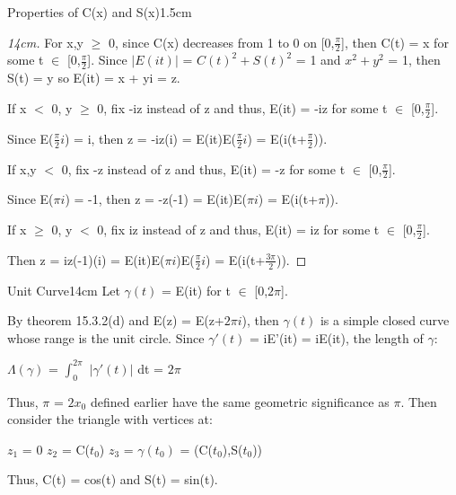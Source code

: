 \begin{ltheorem}{Properties of C(x) and S(x)}{1.5cm}
\begin{proof}[14cm]
                For x,y $\geq$ 0, since C(x) decreases from 1 to 0
                on [0,$\frac{\pi}{2}$], then C(t) = x for some
                t $\in$ [0,$\frac{\pi}{2}$].
                Since $|E(it)|$ = $C(t)^2 + S(t)^2$ = 1
                and $x^2 + y^2$ = 1, then S(t) = y so E(it) = x + yi = z.

                \vspace{0.2cm}

                If x $<$ 0, y $\geq$ 0, fix -iz instead of z and thus,
                E(it) = -iz for some t $\in$ [0,$\frac{\pi}{2}$].
                
                Since E($\frac{\pi}{2}i$) = i, then
                z = -iz(i) = E(it)E($\frac{\pi}{2}i$) = E(i(t+$\frac{\pi}{2}$)).

                \vspace{0.2cm}

                If x,y $<$ 0, fix -z instead of z and thus, E(it) = -z
                for some t $\in$ [0,$\frac{\pi}{2}$].

                Since E($\pi i$) = -1, then
                z = -z(-1) = E(it)E($\pi i$) = E(i(t+$\pi$)).

                \vspace{0.2cm}

                If x $\geq$ 0, y $<$ 0, fix iz instead of z and thus,
                E(it) = iz for some t $\in$ [0,$\frac{\pi}{2}$].

                Then z = iz(-1)(i) = E(it)E($\pi i$)E($\frac{\pi}{2}i$)
                = E(i(t+$\frac{3\pi}{2}$)).
            \end{proof}
    \end{ltheorem}

    \vspace{0.5cm}



    \begin{definition}{Unit Curve}{14cm}
        Let $\gamma(t)$ = E(it) for t $\in$ [0,$2\pi$].

        By {\color{red} theorem 15.3.2(d)} and E(z) = E(z+$2\pi i$), then
        $\gamma(t)$ is a simple closed curve whose range is the unit circle.
        Since $\gamma'(t)$ = iE'(it) = iE(it), the length of $\gamma$:

        \hspace{0.5cm}
        $\Lambda(\gamma)$ = $\int_0^{2\pi}$ $|\gamma'(t)|$ dt = $2\pi$

        Thus, $\pi$ = $2x_0$ defined earlier have the same geometric significance
        as $\pi$. Then consider the triangle with vertices at:

        \hspace{0.5cm}
        $z_1$ = 0
        \hspace{1cm}
        $z_2$ = C($t_0$)
        \hspace{1cm}
        $z_3$ = $\gamma(t_0)$ = (C($t_0$),S($t_0$))

        Thus, C(t) = cos(t) and S(t) = sin(t).
    \end{definition}

